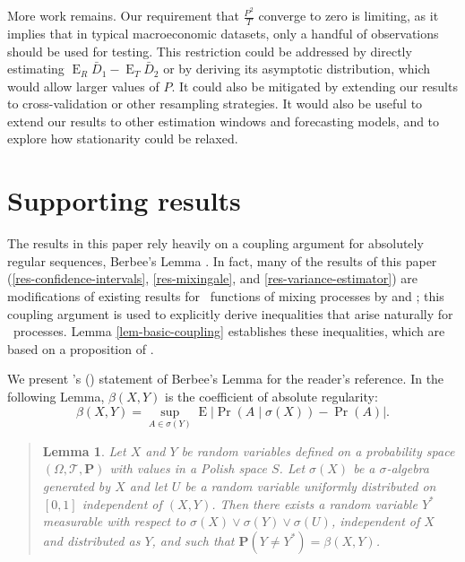 \documentclass[11pt]{article}
\newtheorem{lem}[thm]{Lemma}
\DeclareMathOperator{\E}{E}
\begin{document}
More work remains.  Our requirement that $\frac{P^2}{T}$ converge to
zero is limiting, as it implies that in typical macroeconomic
datasets, only a handful of observations should be used for testing.
This restriction could be addressed by directly estimating $\E_R \bar
D_1 - \E_T \bar{D}_2$ or by deriving its asymptotic distribution,
which would allow larger values of $P$.  It could also be mitigated by
extending our results to cross-validation or other resampling
strategies.  It would also be useful to extend our results to other
estimation windows and forecasting models, and to explore how
stationarity could be relaxed.

\appendix
\section{Supporting results}
The results in this paper rely heavily on a coupling argument for
absolutely regular sequences, Berbee's Lemma \citep{Ber:79}.  In fact,
many of the results of this paper (\ref{res-confidence-intervals},
\ref{res-mixingale}, and \ref{res-variance-estimator}) are
modifications of existing results for \ned\ functions of mixing
processes by \citet{Dej:97} and
\citet{DeD:00}; this coupling argument is used to
explicitly derive inequalities that arise naturally for \ned\
processes.  Lemma \ref{lem-basic-coupling} establishes these
inequalities, which are based on a proposition of
\citet{MeP:02}.

We present \citeauthor{MeP:02}'s
(\citeyear{MeP:02}) statement of Berbee's Lemma for
the reader's reference.  In the following Lemma, $\beta(X,Y)$ is the
coefficient of absolute regularity:
\[
\beta(X,Y) = \sup_{A \in \sigma(Y)} \E \lvert \Pr(A \mid \sigma(X))
  - \Pr(A) \rvert.
\]
\begin{quotation}
\begin{lem}\label{lem-berbee}
  Let $X$ and $Y$ be random variables defined on a probability space
  $(\Omega, \mathcal{T}, \mathbf{P})$ with values in a Polish space
  $S$.  Let $\sigma(X)$ be a $\sigma$-algebra generated by $X$ and let
  $U$ be a random variable uniformly distributed on $[0,1]$
  independent of $(X,Y)$.  Then there exists a random variable $Y^{*}$
  measurable with respect to $\sigma(X) \vee \sigma(Y) \vee
  \sigma(U)$, independent of $X$ and distributed as $Y$, and such that
  $\mathbf{P}(Y \neq Y^{*}) = \beta(X,Y)$.
\end{lem}
\noindent\citep{MeP:02}
\end{quotation}
\end{document}
